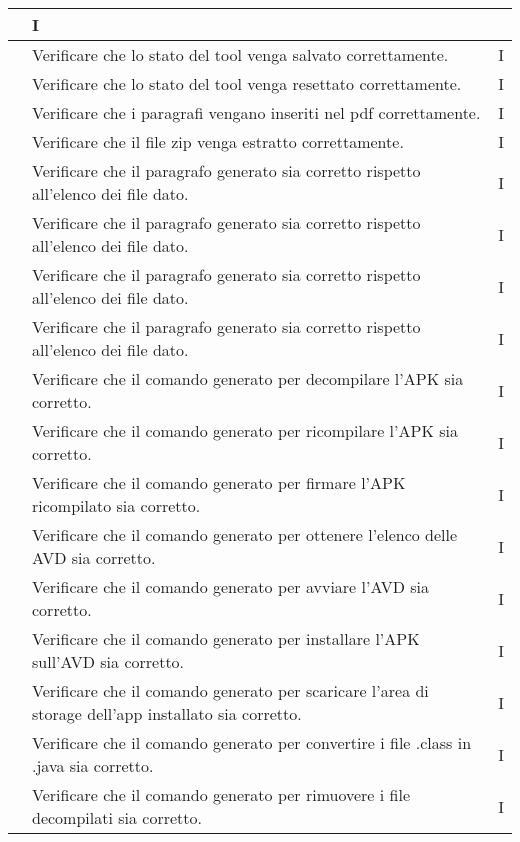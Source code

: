 \begin{longtable}{ |C{3cm} | C{8.5cm}| C{1.5cm} |}
    & I \\\hline
     & Verificare che lo stato del tool venga salvato correttamente.
    & I \\\hline
     & Verificare che lo stato del tool venga resettato correttamente.
    & I \\\hline
     & Verificare che i paragrafi vengano inseriti nel pdf correttamente.
    & I \\\hline
     & Verificare che il file zip venga estratto correttamente.
    & I \\\hline
     & Verificare che il paragrafo generato sia corretto rispetto all'elenco dei file dato.
    & I \\\hline
     & Verificare che il paragrafo generato sia corretto rispetto all'elenco dei file dato.
    & I \\\hline
     & Verificare che il paragrafo generato sia corretto rispetto all'elenco dei file dato.
    & I \\\hline
     & Verificare che il paragrafo generato sia corretto rispetto all'elenco dei file dato.
    & I \\\hline
     & Verificare che il comando generato per decompilare l'APK sia corretto.
    & I \\\hline
     & Verificare che il comando generato per ricompilare l'APK sia corretto.
    & I \\\hline
     & Verificare che il comando generato per firmare l'APK ricompilato sia corretto.
    & I \\\hline
     & Verificare che il comando generato per ottenere l'elenco delle AVD sia corretto.
    & I \\\hline
     & Verificare che il comando generato per avviare l'AVD sia corretto.
    & I \\\hline
     & Verificare che il comando generato per installare l'APK sull'AVD sia corretto.
    & I \\\hline
     & Verificare che il comando generato per scaricare l'area di storage dell'app installato sia corretto.
    & I \\\hline
     & Verificare che il comando generato per convertire i file .class in .java sia corretto.
    & I \\\hline
     & Verificare che il comando generato per rimuovere i file decompilati sia corretto.
    & I \\\hline

\end{longtable}
